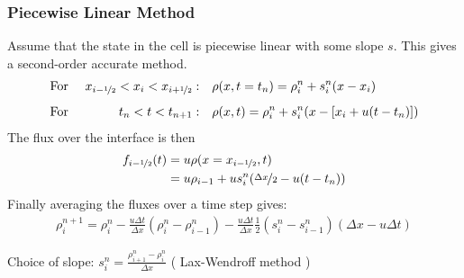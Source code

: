 
\begin{frame}
	\frametitle{Piecewise Linear Method}

		Assume that the state in the cell is piecewise linear with some slope $s$. This gives a second-order accurate method.
		\begin{align*}
			\text{For } && x_{i-\nicefrac{1}{2}} < x_i < x_{i+\nicefrac{1}{2}}: &
			\quad \rho(x, t=t_n) = \rho_i^n + s_i^n(x - x_i)\\[.5em]			
			\text{For }&& t_n < t < t_{n+1}: &\quad \rho(x, t) = \rho_i^n +s_i^n(x -[x_i + u (t - t_n)])
		\end{align*}
%		
		The flux over the interface is then
%
		\begin{align*}
			f_{i-\nicefrac{1}{2}}(t) 	&= u \rho(x = x_{i-\nicefrac{1}{2}}, t)\\
						&= u \rho_{i-1} +  u s_i^n(\nicefrac{\Delta x}{2} - u(t-t_n))
		\end{align*}
%
		Finally averaging the fluxes over a time step gives:
		\begin{align*}
			\rho_i^{n+1} = \rho_i^n - \frac{u \Delta t}{\Delta x} ( \rho_i ^n - \rho_{i-1}^n) - \frac{u \Delta t}{\Delta x} \frac{1}{2} (s_i^n - s_{i-1}^n)(\Delta x - u\Delta t)
		\end{align*}
		
		Choice of slope: $s_i^n = \frac{\rho_{i+1}^n - \rho_i^n}{\Delta x}$ ( Lax-Wendroff method )

\end{frame}









